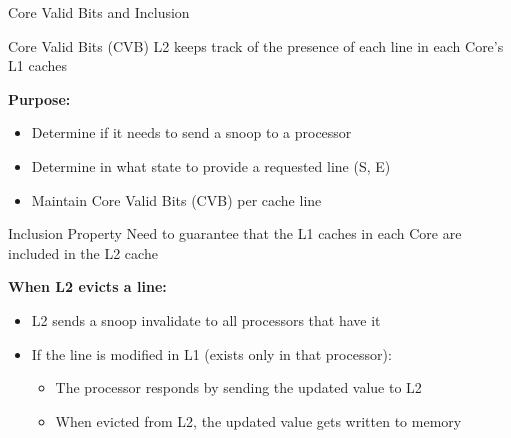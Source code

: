 \documentclass[aspectratio=169,12pt]{beamer}
\begin{document}
\begin{frame}{Core Valid Bits and Inclusion}
\begin{block}{Core Valid Bits (CVB)}
L2 keeps track of the presence of each line in each Core's L1 caches
\end{block}

\textbf{Purpose:}
\begin{itemize}
\item Determine if it needs to send a snoop to a processor
\item Determine in what state to provide a requested line (S, E)
\item Maintain Core Valid Bits (CVB) per cache line
\end{itemize}

\vspace{0.5em}
\begin{alertblock}{Inclusion Property}
Need to guarantee that the L1 caches in each Core are included in the L2 cache
\end{alertblock}

\textbf{When L2 evicts a line:}
\begin{itemize}
\item L2 sends a snoop invalidate to all processors that have it
\item If the line is modified in L1 (exists only in that processor):
    \begin{itemize}
    \item The processor responds by sending the updated value to L2
    \item When evicted from L2, the updated value gets written to memory
    \end{itemize}
\end{itemize}
\end{frame}
\end{document}
